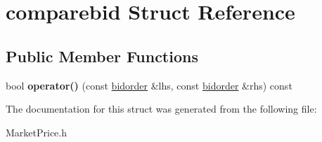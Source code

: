 \hypertarget{structcomparebid}{}\section{comparebid Struct Reference}
\label{structcomparebid}
\subsection*{Public Member Functions}
\begin{DoxyCompactItemize}
\item 
bool {\bfseries operator()} (const \hyperlink{structbidorder}{bidorder} \&lhs, const \hyperlink{structbidorder}{bidorder} \&rhs) const \hypertarget{structcomparebid_a05f816554dc897464562764ddb36ba86}{}\label{structcomparebid_a05f816554dc897464562764ddb36ba86}

\end{DoxyCompactItemize}


The documentation for this struct was generated from the following file\+:\begin{DoxyCompactItemize}
\item 
Market\+Price.\+h\end{DoxyCompactItemize}
